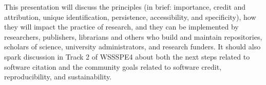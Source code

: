 \documentclass[conference]{IEEEtran}
\begin{document}
This presentation will discuss the principles (in brief: importance, credit and attribution, unique identification, persistence, accessibility, and specificity), how they will impact the practice of research, and they can be implemented by researchers, publishers, librarians and others who build and maintain repositories, scholars of science, university administrators, and research funders. It should also spark discussion in Track 2 of WSSSPE4 about both the next steps related to software citation and the community goals related to software credit, reproducibility, and sustainability.

%
%



%
%
\end{document}
